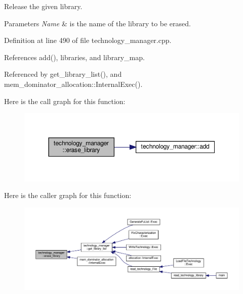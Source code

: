 Release the given library. 


\begin{DoxyParams}{Parameters}
{\em Name} & is the name of the library to be erased. \\
\hline
\end{DoxyParams}


Definition at line 490 of file technology\+\_\+manager.\+cpp.



References add(), libraries, and library\+\_\+map.



Referenced by get\+\_\+library\+\_\+list(), and mem\+\_\+dominator\+\_\+allocation\+::\+Internal\+Exec().

Here is the call graph for this function\+:
\nopagebreak
\begin{figure}[H]
\begin{center}
\leavevmode
\includegraphics[width=350pt]{df/dc7/classtechnology__manager_a17d5f85564ae7e7578966d0875ce9444_cgraph}
\end{center}
\end{figure}
Here is the caller graph for this function\+:
\nopagebreak
\begin{figure}[H]
\begin{center}
\leavevmode
\includegraphics[width=350pt]{df/dc7/classtechnology__manager_a17d5f85564ae7e7578966d0875ce9444_icgraph}
\end{center}
\end{figure}
\mbox{\label{classtechnology__manager_ad5be680d6dcff25992d05aa9ca8652b9}} 
